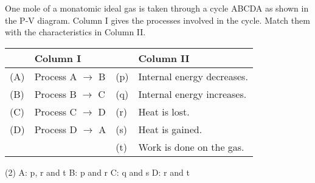 
\item One mole of a monatomic ideal gas is taken through a cycle ABCDA as shown in the P-V diagram. Column I gives the processes involved in the cycle. Match them with the characteristics in Column II.

\begin{center}
\end{center}

\begin{center}
    \renewcommand{\arraystretch}{1.5}
    \begin{table}[h]
        \centering
        \begin{tabular}{p{0.25cm}p{8cm}|p{0.25cm}p{5cm}}
        \hline
        & Column I & &Column II \\
        \hline
        (A)& Process A $\rightarrow$ B & (p) &Internal energy decreases.\\
        (B)& Process B $\rightarrow$ C & (q) &Internal energy increases.\\
        (C)& Process C $\rightarrow$ D & (r) &Heat is lost.\\
        (D)& Process D $\rightarrow$ A & (s) &Heat is gained.\\
        && (t) &Work is done on the gas.\\
        \hline
        \end{tabular}
    \end{table}
\end{center}

\begin{tasks}(2)
    \task A: p, r and t
    \task B: p and r
    \task C: q and s
    \task D: r and t
\end{tasks}
